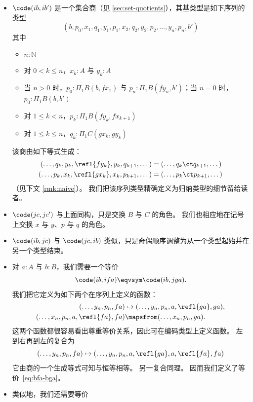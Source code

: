 \begin{itemize}
\item $\code(ib,ib')$ 是一个集合商（见 \cref{sec:set-quotients}），其基类型是如下序列的类型 %
  \[ (b, p_0, x_1, q_1, y_1, p_1, x_2, q_2, y_2, p_2, \dots, y_n, p_n, b') \]
  其中
  \begin{itemize}
  \item $n:\mathbb{N}$
  \item 对 $0<k \le n$，$x_k:A$ 与 $y_k:A$
  \item 当 $n>0$ 时，$p_0:\Pi_1B(b,f x_1)$ 与 $p_n:\Pi_1B(f y_n, b')$；当 $n=0$ 时，$p_0:\Pi_1B(b,b')$
  \item 对 $1\le k < n$，$p_k:\Pi_1B(f y_k, fx_{k+1})$
  \item 对 $1\le k\le n$，$q_k:\Pi_1C(gx_k, gy_k)$
  \end{itemize}
  该商由如下等式生成：
  \begin{align*}
    (\dots, q_k, y_k, \refl{fy_k}, y_k, q_{k+1},\dots)
    &= (\dots, q_k\ct q_{k+1},\dots)\\
    (\dots, p_k, x_k, \refl{gx_k}, x_k, p_{k+1},\dots)
    &= (\dots, p_k\ct p_{k+1},\dots)
  \end{align*}
  （见下文 \cref{rmk:naive}）。
  我们把该序列类型精确定义为归纳类型的细节留给读者。
\item $\code(jc,jc')$ 与上面同构，只是交换 $B$ 与 $C$ 的角色。
  我们也相应地在记号上交换 $x$ 与 $y$、$p$ 与 $q$ 的角色。
\item $\code(ib,jc)$ 与 $\code(jc,ib)$ 类似，只是奇偶顺序调整为从一个类型起始并在另一个类型结束。
\item 对 $a:A$ 与 $b:B$，我们需要一个等价
  \begin{equation}
    \code(ib, ifa) \eqvsym \code(ib,jga).\label{eq:bfa-bga}
  \end{equation}
  我们把它定义为如下两个在序列上定义的函数：
  \begin{align*}
    (\dots, y_n, p_n,fa) &\mapsto (\dots,y_n,p_n,a,\refl{ga},ga),\\
    (\dots, x_n, p_n, a, \refl{fa}, fa) &\mapsfrom (\dots, x_n, p_n, ga).
  \end{align*}
  这两个函数都很容易看出尊重等价关系，因此可在编码类型上定义函数。
  左到右再到左的复合为
  \[ (\dots, y_n, p_n,fa) \mapsto
  (\dots,y_n,p_n,a,\refl{ga},a,\refl{fa},fa)
  \]
  它由商的一个生成等式可知与恒等相等。
  另一复合同理。
  因而我们定义了等价~\eqref{eq:bfa-bga}。
\item 类似地，我们还需要等价
  \begin{align*}

\end{align*}
\end{itemize}
